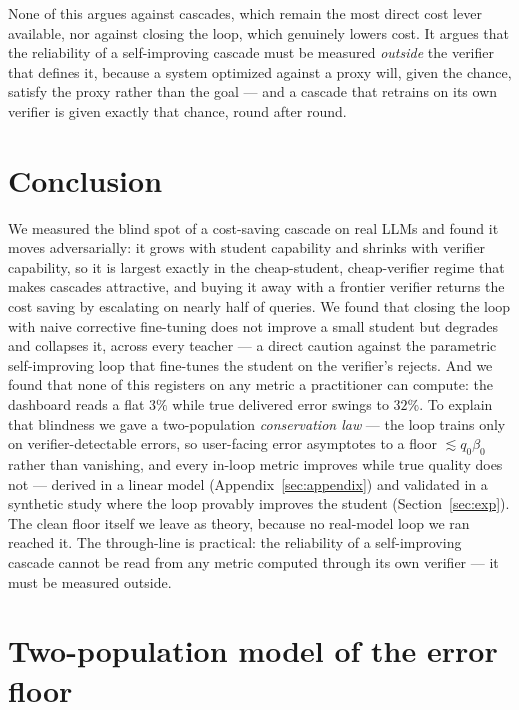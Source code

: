 \documentclass[11pt]{article}
\begin{document}
None of this argues against cascades, which remain the most direct cost
lever available, nor against closing the loop, which genuinely lowers
cost. It argues that the reliability of a self-improving cascade must be
measured \emph{outside} the verifier that defines it, because a system
optimized against a proxy will, given the chance, satisfy the proxy
rather than the goal --- and a cascade that retrains on its own verifier
is given exactly that chance, round after round.

\section{Conclusion}

We measured the blind spot of a cost-saving cascade on real LLMs and
found it moves adversarially: it grows with student capability and
shrinks with verifier capability, so it is largest exactly in the
cheap-student, cheap-verifier regime that makes cascades attractive, and
buying it away with a frontier verifier returns the cost saving by
escalating on nearly half of queries. We found that closing the loop
with naive corrective fine-tuning does not improve a small student but
degrades and collapses it, across every teacher --- a direct caution
against the parametric self-improving loop that fine-tunes the student
on the verifier's rejects. And we found that none of this registers on
any metric a practitioner can compute: the dashboard reads a flat
\(3\%\) while true delivered error swings to \(32\%\). To explain that
blindness we gave a two-population \emph{conservation law} --- the loop
trains only on verifier-detectable errors, so user-facing error
asymptotes to a floor \(\lesssim q_{0}\beta_{0}\) rather than vanishing,
and every in-loop metric improves while true quality does not ---
derived in a linear model (Appendix~\ref{sec:appendix}) and validated in a
synthetic study where the loop provably improves the student
(Section~\ref{sec:exp}). The clean floor itself we leave as theory,
because no real-model loop we ran reached it. The through-line is
practical: the reliability of a self-improving cascade cannot be read
from any metric computed through its own verifier --- it must be
measured outside.

\appendix
\section{Two-population model of the error floor}

\protect{}\label{sec:appendix}{}
\end{document}
